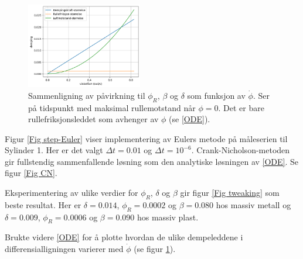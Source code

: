 \begin{figure}[p] 
	\begin{center}
            \includegraphics[width=0.45\textwidth]{img/comparison_d_b_r.png}
    \end{center}
	\caption{Sammenligning av påvirkning til \(\phi_R\), \(\beta\) og \(\delta\) som funksjon av \(\dot{\phi}\). Ser på tidspunkt med maksimal rullemotstand når \(\phi = 0\). Det er bare rullefriksjonsleddet som avhenger av \(\phi\) (se \eqref{ODE}).}
	\label{Fig comparison} %
\end{figure}

Figur \ref{Fig step-Euler} viser implementering av Eulers metode på måle\-serien til Sylinder 1. Her er det valgt \(\Delta t = 0.01\) og \(\Delta t = 10^{-6}\). 
Crank-Nicholson-metoden gir fullstendig sammenfallende løsning som den analytiske løsningen av \eqref{ODE}. Se figur \ref{Fig CN}.

Eksperimentering av ulike verdier for \(\phi_R\), \(\delta\) og \(\beta\) gir figur \ref{Fig tweaking} som beste resultat. Her er \(\delta = 0.014\), \(\phi_R = 0.0002\) og \(\beta = 0.080\) hos massiv metall og \(\delta = 0.009\), \(\phi_R = 0.0006\) og \(\beta = 0.090\) hos massiv plast.
\par
Brukte videre \eqref{ODE} for å plotte hvordan de ulike dempeleddene i differensialligningen varierer med \(\dot{\phi}\) (se figur \ref{Fig comparison}).
